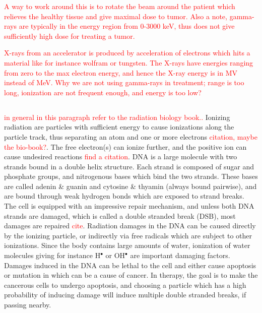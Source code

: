 \documentclass[a4paper,11pt,twoside]{book}
\begin{document}
\textcolor{red}{
A way to work around this is to rotate the beam around the patient which relieves the healthy tissue and give maximal dose to tumor. Also a note, gamma-rays are typically in the energy region from 0-3000 keV, thus does not give sufficiently high dose for treating a tumor. 

X-rays from an accelerator is produced by acceleration of electrons which hits a material like for instance wolfram or tungsten. The X-rays have energies ranging from zero to the max electron energy, and hence the X-ray energy is in MV instead of MeV. 
Why we are not using gamma-rays in treatment; range is too long, ionization are not frequent enough, and energy is too low?}




\subsection*{}
\textcolor{red}{in general in this paragraph refer to the radiation biology book.. }
Ionizing radiation are particles with sufficient energy to cause ionizations along the particle track, thus separating an atom and one or more electrons \textcolor{red}{citation, maybe the bio-book?}. The free electron(s) can ionize further, and the positive ion can cause undesired reactions \textcolor{red}{find a citation}. DNA is a large molecule with two strands bound in a double helix structure. Each strand is composed of sugar and phosphate groups, and nitrogenous bases which bind the two strands. These bases are called adenin \& guanin and cytosine \& thyamin (always bound pairwise), and are bound through weak hydrogen bonds which are exposed to strand breaks. The cell is equipped with an impressive repair mechanism, and  unless both DNA strands are damaged, which is called a double stranded break (DSB), most damages are repaired \textcolor{red}{cite}. Radiation damages in the DNA can be caused directly by the ionizing particle, or indirectly via free radicals which are subject to other ionizations.  Since the body contains large amounts of water, ionization of water molecules giving for instance H$^\bullet$ or OH$^\bullet$ are important damaging factors. Damages induced in the DNA can be lethal to the cell and either cause apoptosis or mutation in which can be a cause of cancer. In therapy, the goal is to make the cancerous cells to undergo apoptosis, and choosing a particle which has a high probability of inducing damage will induce multiple double stranded breaks, if passing nearby. \\
\end{document}
